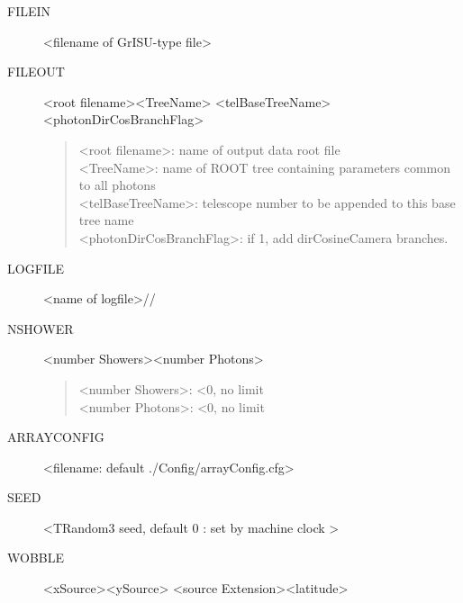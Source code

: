 \documentclass{article}
\begin{document}
\begin{description}
\item[FILEIN] \textless filename of GrISU-type file\textgreater
\item[FILEOUT] \textless root filename\textgreater  \textless TreeName\textgreater 
  \textless telBaseTreeName\textgreater  \textless photonDirCosBranchFlag\textgreater 
 \setlength{\itemsep}{0cm}%
 \setlength{\parskip}{0cm}%
\begin{quote}
  \textless root filename\textgreater : name of output data root file \\
  \textless TreeName\textgreater : name of ROOT tree containing parameters common to all photons \\
  \textless telBaseTreeName\textgreater : telescope number to be appended to this base tree name \\
  \textless photonDirCosBranchFlag\textgreater : if 1, add dirCosineCamera branches.
  
\end{quote}

\item[LOGFILE] \textless name of logfile\textgreater   //


\item[NSHOWER] \textless number Showers\textgreater \textless number Photons\textgreater
\begin{quote}
  \textless number Showers\textgreater : \textless $0$, no limit \\
  \textless number Photons\textgreater : \textless $0$, no limit \\
  
\end{quote}

\item[ARRAYCONFIG] \textless filename: default ./Config/arrayConfig.cfg\textgreater \\
  
\item[SEED] \textless TRandom3 seed, default $0$ : set by machine clock \textgreater \\

\item[WOBBLE]  \textless xSource\textgreater \textless ySource\textgreater 
  \textless source Extension\textgreater \textless latitude\textgreater


\end{description}
\end{document}
